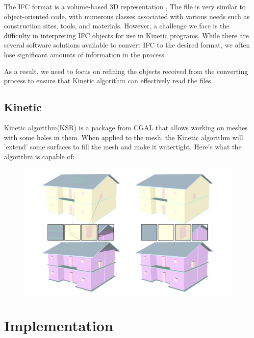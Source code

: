 \documentclass{article}
\begin{document}
The IFC format is a volume-based 3D representation , The file is very similar to object-oriented code, with numerous classes associated with various needs such as construction sites, tools, and materials.
However, a challenge we face is the difficulty in interpreting IFC objects for use in Kinetic programs. While there are several software solutions available to convert IFC to the desired format, 
we often lose significant amounts of information in the process.

As a result, we need to focus on refining the objects received from the converting process to ensure that Kinetic algorithm can effectively read the files.

\subsection{Kinetic}

Kinetic algorithm(KSR) is a package from CGAL that allows working on meshes with 
some holes in them. When applied to the mesh, the Kinetic algorithm will 'extend' some surfaces to fill the mesh and make it watertight. 
Here's what the algorithm is capable of:


\begin{figure}[H]
    
\includegraphics[scale =   0.3 ]{../../images/example_algorithm.png}

\end{figure}


\section{Implementation}
\end{document}
